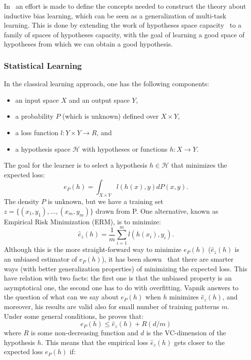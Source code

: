 In~\cite{baxter2000model} an effort is made to define the concepts needed to construct the theory about inductive bias learning, which can be seen as a generalization of multi-task learning. This is done by extending the work of hypotheses space capacity~\cite{vapnik2013nature} to a family of spaces of hypotheses capacity, with the goal of learning a good space of hypotheses from which we can obtain a good hypothesis.

\subsubsection*{Statistical Learning}
In the classical learning approach, one has the following components:
\begin{itemize}
    \item an input space $X$ and an output space $Y$,
    \item a probability $P$ (which is unknown) defined over $X \times Y$,
    \item a loss function $l:Y \times Y \to R$, and
    \item a hypothesis space $\mathcal{H}$ with hypotheses or functions $h: X \to Y$.
\end{itemize}
The goal for the learner is to select a hypothesis $h \in \mathcal{H}$ that minimizes the expected loss:
$$ e_P(h) =  \int_{X \times Y} l(h(x), y) dP(x, y) .$$
The density $P$ is unknown, but we have a training set $z = \{(x_1, y_1), \ldots, (x_m, y_m)\}$ drawn from P. One alternative, known as Empirical Risk Minimization (ERM), is to minimize:
$$ \hat{e}_z(h) = \frac{1}{m} \sum_{i=1}^m l(h(x_i), y_i).$$
Although this is the more straight-forward way to minimize $e_P(h)$ ($ \hat{e}_z(h)$ is an unbiased estimator of $e_P(h)$), it has been shown~\cite{vapnik2013nature} that there are smarter ways (with better generalization properties) of minimizing the expected loss.
This have relation with two facts: the first one is that the unbiased property is an asymptotical one, the second one has to do with overfitting.
Vapnik answers to the question of what can we say about $e_P(h)$ when $h$ minimizes $\hat{e}_z(h)$, and moreover, his results are valid also for small number of training patterns $m$.
Under some general conditions, he proves that:
\begin{equation}\label{eq:classic_bound}
    e_P(h) \leq \hat{e}_z(h) + R(d/m)
\end{equation}
where $R$ is some non-decreasing function and $d$ is the VC-dimension of the hypothesis $h$. This means that the empirical loss $\hat{e}_z(h)$ gets closer to the expected loss $e_P(h)$ if:
